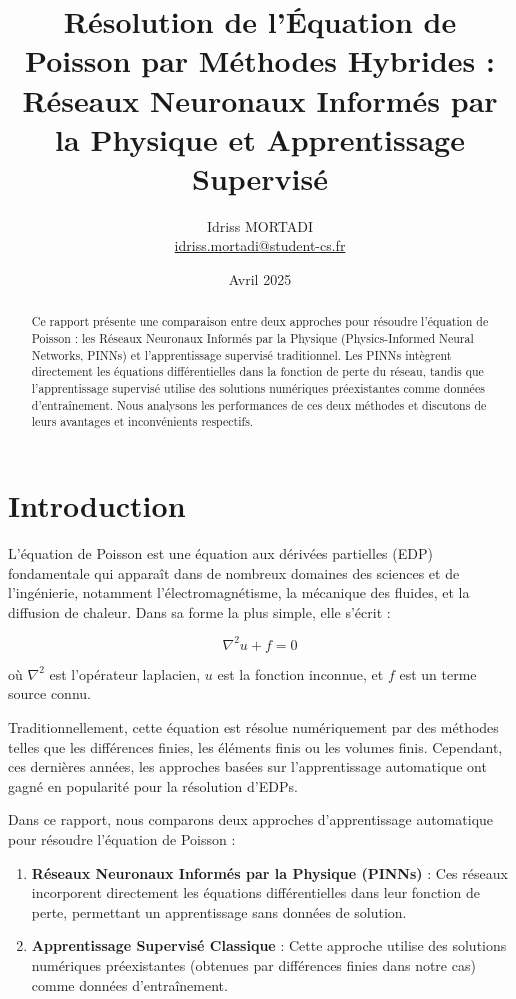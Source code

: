 \documentclass[11pt,a4paper]{article}
\title{Résolution de l'Équation de Poisson par Méthodes Hybrides : \\
Réseaux Neuronaux Informés par la Physique et Apprentissage Supervisé}
\author{Idriss MORTADI \\ \href{mailto:idriss.mortadi@student-cs.fr}{idriss.mortadi@student-cs.fr}}
\date{Avril 2025}
\begin{document}
\maketitle

\begin{abstract}
    Ce rapport présente une comparaison entre deux approches pour résoudre l'équation de Poisson : les Réseaux Neuronaux Informés par la Physique (Physics-Informed Neural Networks, PINNs) et l'apprentissage supervisé traditionnel. Les PINNs intègrent directement les équations différentielles dans la fonction de perte du réseau, tandis que l'apprentissage supervisé utilise des solutions numériques préexistantes comme données d'entraînement. Nous analysons les performances de ces deux méthodes et discutons de leurs avantages et inconvénients respectifs.
\end{abstract}

\tableofcontents

\newpage
\section{Introduction}

L'équation de Poisson est une équation aux dérivées partielles (EDP) fondamentale qui apparaît dans de nombreux domaines des sciences et de l'ingénierie, notamment l'électromagnétisme, la mécanique des fluides, et la diffusion de chaleur. Dans sa forme la plus simple, elle s'écrit :

\begin{equation}
    \nabla^2 u + f = 0
\end{equation}

où $\nabla^2$ est l'opérateur laplacien, $u$ est la fonction inconnue, et $f$ est un terme source connu.

Traditionnellement, cette équation est résolue numériquement par des méthodes telles que les différences finies, les éléments finis ou les volumes finis. Cependant, ces dernières années, les approches basées sur l'apprentissage automatique ont gagné en popularité pour la résolution d'EDPs.

Dans ce rapport, nous comparons deux approches d'apprentissage automatique pour résoudre l'équation de Poisson :
\begin{enumerate}
    \item \textbf{Réseaux Neuronaux Informés par la Physique (PINNs)} : Ces réseaux incorporent directement les équations différentielles dans leur fonction de perte, permettant un apprentissage sans données de solution.
    \item \textbf{Apprentissage Supervisé Classique} : Cette approche utilise des solutions numériques préexistantes (obtenues par différences finies dans notre cas) comme données d'entraînement.
\end{enumerate}
\end{document}
